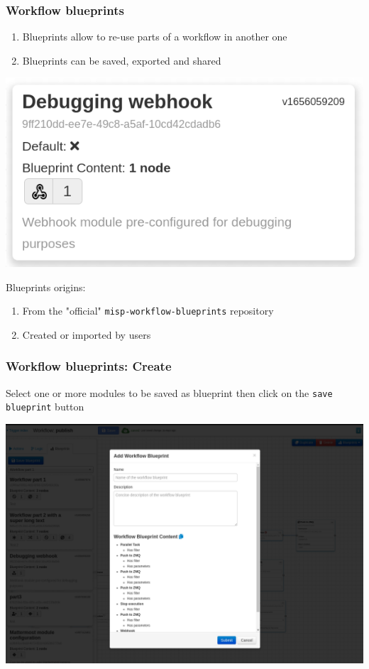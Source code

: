 \begin{frame}
    \frametitle{Workflow blueprints}
    \begin{enumerate}
        \item Blueprints allow to re-use parts of a workflow in another one
        \item Blueprints can be saved, exported and shared
    \end{enumerate}
    \begin{center}
        \includegraphics[width=0.5\linewidth]{pictures/blueprint-debugging.png}
    \end{center}
    Blueprints origins:
    \begin{enumerate}
        \item From the "official" \texttt{misp-workflow-blueprints} repository
        \item Created or imported by users
    \end{enumerate}
\end{frame}

\begin{frame}
    \frametitle{Workflow blueprints: Create}
    Select one or more modules to be saved as blueprint then click on the \texttt{save blueprint} button
    \begin{center}
        \includegraphics[width=0.85\linewidth]{pictures/blueprint-1.png}
    \end{center}
\end{frame}

